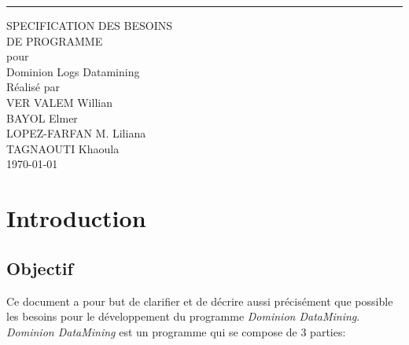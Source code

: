 \documentclass{scrreprt}
\date{}
\begin{document}
\begin{flushright}
    \rule{16cm}{5pt}\vskip1cm
    \begin{bfseries}
        \Huge{SPECIFICATION DES BESOINS\\ DE PROGRAMME }\\
        \vspace{1.9cm}
        pour\\
        \vspace{1.9cm}
        Dominion Logs Datamining\\
        \vspace{1.9cm}
        Réalisé par \\ VER VALEM Willian \\ BAYOL Elmer \\ LOPEZ-FARFAN M. Liliana
        \\ TAGNAOUTI Khaoula\\
        \vspace{1.9cm}
        \today\\
    \end{bfseries}
\end{flushright}

\tableofcontents




\chapter{Introduction}

\section{Objectif}

Ce document a pour but de clarifier et de décrire aussi précisément que possible les besoins pour le développement du programme \textit{Dominion DataMining}.\\
\textit{Dominion DataMining} est un programme qui se compose de 3 parties:
\end{document}
